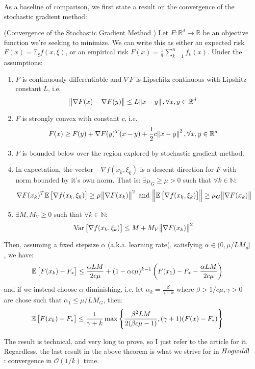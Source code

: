 As a baseline of comparison, we first state a result on the convergence of the
stochastic gradient method:
\begin{theorem} \label{thm:sgd}
  (Convergence of the Stochastic Gradient Method \cite{2016BCN}) Let $F:
  \mathbb{R}^d \to \mathbb{R}$ be an objective function we're seeking to
  minimize. We can write this as either an expected risk $F(x)
  = \mathbb{E}_\xi{f(x, \xi)}$, or an empirical risk $F(x) = \frac{1}{n}
  \sum_{k=1}^n f_k(x)$.  Under the assumptions:
  \begin{enumerate}[(1)]
    \item $F$ is continuously differentiable and $\nabla F$ is Lipschitz
      continuous with Lipshitz constant $L$, i.e.
      \[
        \norm{\nabla F(x) - \nabla F(y)} 
        \leq
        L\norm{x-y}, \forall x,y \in \mathbb{R}^d
      \]
    \item $F$ is strongly convex with constant $c$, i.e.
      \[
        F(x) \geq F(y) + \nabla F(y)^T (x-y) + \frac{1}{2}c\norm{x-y}^2, 
        \forall x,y \in \mathbb{R}^d
      \]
    \item $F$ is bounded below over the region explored by stochastic gradient
      method.
    \item In expectation, the vector $-\nabla f(x_k, \xi_k)$ is a descent
      direction for $F$ with norm bounded by it's own norm. That is: $\exists
      \mu_G \geq \mu > 0$ such that $\forall k \in \mathbb{N}$:
      \[
        \nabla F(x_k)^T \mathbb{E}\left[\nabla f(x_k,\xi_k)\right] \geq \mu \norm{\nabla F(x_k)}^2
        \text{ and }
        \norm{ \mathbb{E}\left[\nabla f(x_k,\xi_k)\right] } \geq \mu_G \norm{\nabla F(x_k)}
      \]
    \item $\exists M, M_V \geq 0$ such that $\forall k\in \mathbb{N}$:
      \[
        {\rm Var}\left[\nabla f(x_k, \xi_k)\right] \leq M + M_V \norm{\nabla F(x_k)}^2
      \]
  \end{enumerate}
  Then, assuming a fixed stepsize $\alpha$ (a.k.a. learning rate), satisfying
  $\alpha \in (0, \mu/ LM_g]$, we have:
  \[
    \mathbb{E}\left[F(x_k) - F_*\right] 
    \leq 
    \frac{\alpha LM}{2c\mu} + (1 - \alpha c \mu)^{k-1}
    \left(
      F(x_1) - F_* - \frac{\alpha LM}{2c\mu}
    \right)
  \]
  and if we instead choose $\alpha$ diminishing, i.e. let $\alpha_k
  = \frac{\beta}{\gamma + k}$ where $\beta > 1/c\mu, \gamma > 0$ are chose such
  that $\alpha_1 \leq \mu/LM_G$, then:
  \[
    \mathbb{E}\left[F(x_k) - F_*\right] 
    \leq 
    \frac{1}{\gamma + k} \max
    \left\{
      \frac{\beta^2 LM}{2(\beta c \mu -1)},
      (\gamma + 1)(F(x) - F_*)
    \right\}
  \]
\end{theorem}
The result is technical, and very long to prove, so I just refer to the article
\cite{2016BCN} for it. Regardless, the last result in the above theorem is what
we strive for in $H{\sc ogwild}!$: convergence in $\mathcal{O}(1/k)$ time.



